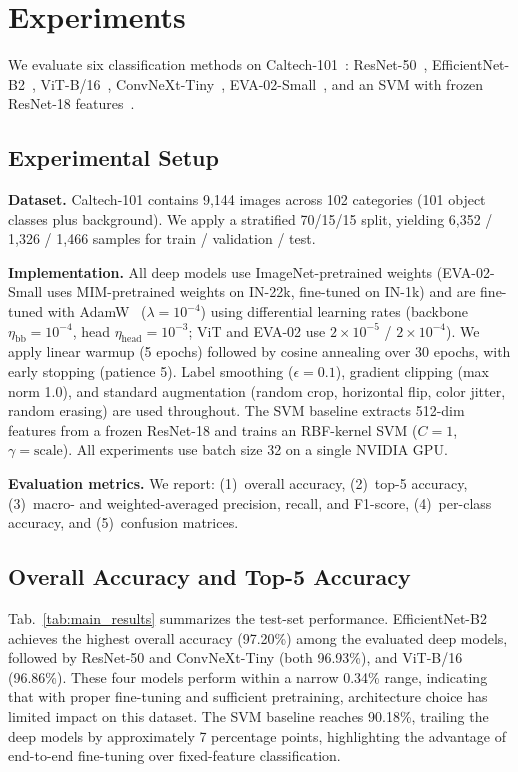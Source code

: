 \section{Experiments}

We evaluate six classification methods on Caltech-101~\citep{fei2004learning}: ResNet-50~\citep{he2016deep}, EfficientNet-B2~\citep{tan2019efficientnet}, ViT-B/16~\citep{dosovitskiy2020image}, ConvNeXt-Tiny~\citep{liu2022convnet}, EVA-02-Small~\citep{fang2024eva}, and an SVM with frozen ResNet-18 features~\citep{donahue2014decaf}.

\subsection{Experimental Setup}

\textbf{Dataset.} Caltech-101 contains 9{,}144 images across 102 categories (101 object classes plus background). We apply a stratified 70/15/15 split, yielding 6{,}352 / 1{,}326 / 1{,}466 samples for train / validation / test.

\textbf{Implementation.} All deep models use ImageNet-pretrained weights (EVA-02-Small uses MIM-pretrained weights on IN-22k, fine-tuned on IN-1k) and are fine-tuned with AdamW~\citep{loshchilov2017decoupled} ($\lambda{=}10^{-4}$) using differential learning rates (backbone $\eta_{\text{bb}}{=}10^{-4}$, head $\eta_{\text{head}}{=}10^{-3}$; ViT and EVA-02 use $2{\times}10^{-5}$ / $2{\times}10^{-4}$). We apply linear warmup (5 epochs) followed by cosine annealing over 30 epochs, with early stopping (patience 5). Label smoothing ($\epsilon{=}0.1$), gradient clipping (max norm 1.0), and standard augmentation (random crop, horizontal flip, color jitter, random erasing) are used throughout. The SVM baseline extracts 512-dim features from a frozen ResNet-18 and trains an RBF-kernel SVM ($C{=}1$, $\gamma{=}\text{scale}$). All experiments use batch size 32 on a single NVIDIA GPU.

\textbf{Evaluation metrics.} We report: (1)~overall accuracy, (2)~top-5 accuracy, (3)~macro- and weighted-averaged precision, recall, and F1-score, (4)~per-class accuracy, and (5)~confusion matrices.

\subsection{Overall Accuracy and Top-5 Accuracy}

Tab.~\ref{tab:main_results} summarizes the test-set performance. EfficientNet-B2 achieves the highest overall accuracy (97.20\%) among the evaluated deep models, followed by ResNet-50 and ConvNeXt-Tiny (both 96.93\%), and ViT-B/16 (96.86\%). These four models perform within a narrow 0.34\% range, indicating that with proper fine-tuning and sufficient pretraining, architecture choice has limited impact on this dataset. The SVM baseline reaches 90.18\%, trailing the deep models by approximately 7 percentage points, highlighting the advantage of end-to-end fine-tuning over fixed-feature classification.

